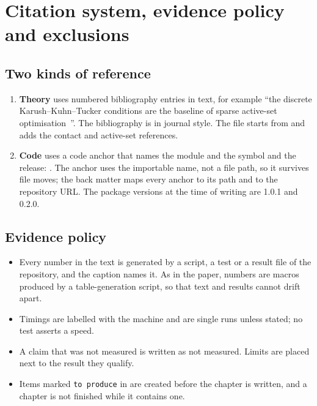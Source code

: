 \section{Citation system, evidence policy and exclusions}\label{sec:rules}

\subsection{Two kinds of reference}\label{sec:citations}
\begin{enumerate}
\item \textbf{Theory} uses numbered bibliography entries in text, for example ``the discrete Karush--Kuhn--Tucker conditions are the baseline of sparse active-set optimisation~\cite{wohlmuth2011contact,hintermuller2002pdas}''. The bibliography is in journal style. The file  starts from  and adds the contact and active-set references.
\item \textbf{Code} uses a code anchor that names the module and the symbol and the release: . The anchor uses the importable name, not a file path, so it survives file moves; the back matter maps every anchor to its path and to the repository URL. The package versions at the time of writing are \fea{} 1.0.1 and \rom{} 0.2.0.
\end{enumerate}

\subsection{Evidence policy}
\begin{itemize}
\item Every number in the text is generated by a script, a test or a result file of the repository, and the caption names it. As in the paper, numbers are macros produced by a table-generation script, so that text and results cannot drift apart.
\item Timings are labelled with the machine and are single runs unless stated; no test asserts a speed.
\item A claim that was not measured is written as not measured. Limits are placed next to the result they qualify.
\item Items marked \texttt{to produce} in  are created before the chapter is written, and a chapter is not finished while it contains one.
\end{itemize}

